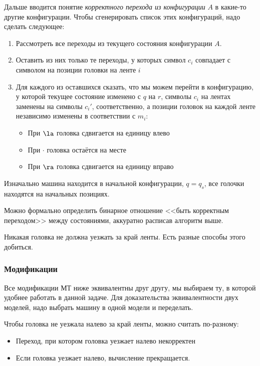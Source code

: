 Дальше вводится понятие \textit{корректного перехода из конфигурации} $A$ в какие-то другие конфигурации.
Чтобы сгенерировать список этих конфигураций, надо сделать следующее:
\begin{enumerate}
	\item Рассмотреть все переходы из текущего состояния конфигурации $A$.
	\item Оставить из них только те переходы, у которых символ $c_i$ совпадает с символом на позиции головки на ленте $i$
	\item
		Для каждого из оставшихся сказать, что мы можем перейти в конфигурацию, у которой текущее состояние изменено с $q$ на $r$,
		символы $c_i$ на лентах заменены на символы $c_i'$, соответственно, а позиции головок на каждой ленте независимо изменены в соответствии с $m_i$:
	\begin{itemize}
		\item При $\la$ головка сдвигается на единицу влево
		\item При $\cdot$ головка остаётся на месте
		\item При $\ra$ головка сдвигается на единицу вправо
	\end{itemize}
\end{enumerate}

\begin{Rem}
	Изначально машина находится в начальной конфигурации, $q = q_s$, все голочки находятся на начальных позициях.
\end{Rem}

\begin{Rem}
	Можно формально определить бинарное отношение <<быть корректным переходом>> между состояниями,
	аккуратно расписав алгоритм выше.
\end{Rem}

\begin{Rem}
	Никакая головка не должна уезжать за край ленты.
	Есть разные способы этого добиться.
\end{Rem}

\subsubsection{Модификации}
Все модификации МТ ниже эквивалентны друг другу, мы выбираем ту, в которой удобнее работать в данной задаче.
Для доказательства эквивалентности двух моделей, надо выбрать машину в одной модели и переделать.

Чтобы головка не уезжала налево за край ленты, можно считать по-разному:
\begin{itemize}
	\item Переход, при котором головка уезжает налево некорректен
	\item Если головка уезжает налево, вычисление прекращается.
\end{itemize}

